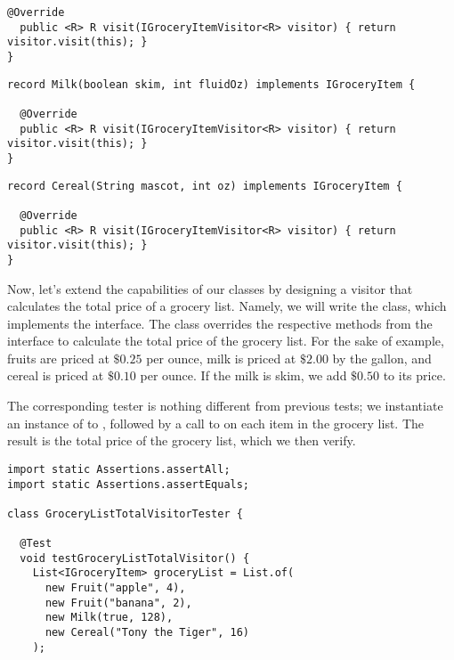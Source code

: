 \begin{verbnobox}[\footnotesize]
\begin{cl}[]{}
\begin{lstlisting}[language=MyJava]
  @Override
  public <R> R visit(IGroceryItemVisitor<R> visitor) { return visitor.visit(this); }
}
\end{lstlisting}
\end{cl}

\begin{cl}[]{}
\begin{lstlisting}[language=MyJava]
record Milk(boolean skim, int fluidOz) implements IGroceryItem {
  
  @Override
  public <R> R visit(IGroceryItemVisitor<R> visitor) { return visitor.visit(this); }
}
\end{lstlisting}
\end{cl}

\begin{cl}[]{}
\begin{lstlisting}[language=MyJava]
record Cereal(String mascot, int oz) implements IGroceryItem {
    
  @Override
  public <R> R visit(IGroceryItemVisitor<R> visitor) { return visitor.visit(this); }
}
\end{lstlisting}
\end{cl}

Now, let's extend the capabilities of our classes by designing a visitor that calculates the total price of a grocery list. Namely, we will write the  class, which implements the  interface. The  class overrides the respective methods from the  interface to calculate the total price of the grocery list. For the sake of example, fruits are priced at $\$0.25$ per ounce, milk is priced at $\$2.00$ by the gallon, and cereal is priced at $\$0.10$ per ounce. If the milk is skim, we add $\$0.50$ to its price.

The corresponding tester is nothing different from previous tests; we instantiate an instance of  to , followed by a call to  on each item in the grocery list. The result is the total price of the grocery list, which we then verify.

\begin{cl}[]{}
\begin{lstlisting}[language=MyJava]
import static Assertions.assertAll;
import static Assertions.assertEquals;

class GroceryListTotalVisitorTester {

  @Test
  void testGroceryListTotalVisitor() {
    List<IGroceryItem> groceryList = List.of(
      new Fruit("apple", 4),
      new Fruit("banana", 2),
      new Milk(true, 128),
      new Cereal("Tony the Tiger", 16)
    );


\end{lstlisting}
\end{cl}
\end{verbnobox}
